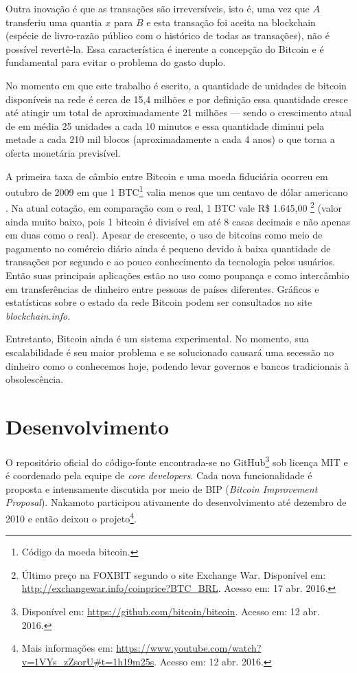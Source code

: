 Outra inovação é que as transações são irreversíveis, isto é, uma vez que $A$ transferiu uma quantia $x$ para $B$ e esta transação foi aceita na blockchain (espécie de livro-razão público com o histórico de todas as transações), não é possível revertê-la. Essa característica é inerente a concepção do Bitcoin e é fundamental para evitar o problema do gasto duplo.

No momento em que este trabalho é escrito, a quantidade de unidades de bitcoin disponíveis na rede é cerca de 15,4 milhões e por definição essa quantidade cresce até atingir um total de aproximadamente 21 milhões --- sendo o crescimento atual de em média 25 unidades a cada 10 minutos e essa quantidade diminui pela metade a cada 210 mil blocos (aproximadamente a cada 4 anos) o que torna a oferta monetária previsível.

A primeira taxa de câmbio entre Bitcoin e uma moeda fiduciária ocorreu em outubro de 2009 em que 1 BTC\footnote{Código da moeda bitcoin.} valia menos que um centavo de dólar americano \cite{bib:historyofbitcoin}. Na atual cotação, em comparação com o real, 1 BTC vale R\$ 1.645,00 \footnote{Último preço na FOXBIT segundo o site Exchange War. Disponível em: \url{http://exchangewar.info/coinprice?BTC_BRL}. Acesso em: 17 abr. 2016.} (valor ainda muito baixo, pois 1 bitcoin é divisível em até 8 casas decimais e não apenas em duas como o real). Apesar de crescente, o uso de bitcoins como meio de pagamento no comércio diário ainda é pequeno devido à baixa quantidade de transações por segundo e ao pouco conhecimento da tecnologia pelos usuários. Então suas principais aplicações estão no uso como poupança e como intercâmbio em transferências de dinheiro entre pessoas de países diferentes. Gráficos e estatísticas sobre o estado da rede Bitcoin podem ser consultados no site \textit{blockchain.info}.

Entretanto, Bitcoin ainda é um sistema experimental. No momento, sua escalabilidade é seu maior problema e se solucionado causará uma secessão no dinheiro como o conhecemos hoje, podendo levar governos e bancos tradicionais à obsolescência.

\section{Desenvolvimento}

O repositório oficial do código-fonte encontrada-se no GitHub\footnote{Disponível em: \url{https://github.com/bitcoin/bitcoin}. Acesso em: 12 abr. 2016.} sob licença MIT e é coordenado pela equipe de \textit{core developers}. Cada nova funcionalidade é proposta e intensamente discutida por meio de BIP (\textit{Bitcoin Improvement Proposal}). Nakamoto participou ativamente do desenvolvimento até dezembro de 2010 e então deixou o projeto\footnote{Mais informações em: \url{https://www.youtube.com/watch?v=1VYs_zZsorU\#t=1h19m25s}. Acesso em: 12 abr. 2016.}.

